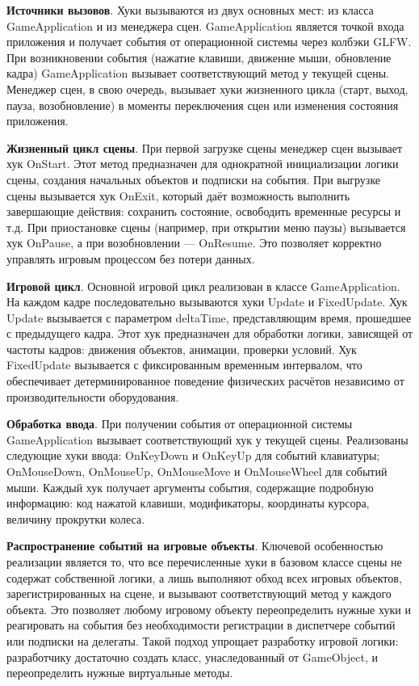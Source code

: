 \textbf{Источники вызовов}. Хуки вызываются из двух основных мест: из класса GameApplication и из менеджера сцен. GameApplication является точкой входа приложения и получает события от операционной системы через колбэки GLFW. При возникновении события (нажатие клавиши, движение мыши, обновление кадра) GameApplication вызывает соответствующий метод у текущей сцены. Менеджер сцен, в свою очередь, вызывает хуки жизненного цикла (старт, выход, пауза, возобновление) в моменты переключения сцен или изменения состояния приложения.

\textbf{Жизненный цикл сцены}. При первой загрузке сцены менеджер сцен вызывает хук OnStart. Этот метод предназначен для однократной инициализации логики сцены, создания начальных объектов и подписки на события. При выгрузке сцены вызывается хук OnExit, который даёт возможность выполнить завершающие действия: сохранить состояние, освободить временные ресурсы и т.д. При приостановке сцены (например, при открытии меню паузы) вызывается хук OnPause, а при возобновлении — OnResume. Это позволяет корректно управлять игровым процессом без потери данных.

\textbf{Игровой цикл}. Основной игровой цикл реализован в классе GameApplication. На каждом кадре последовательно вызываются хуки Update и FixedUpdate. Хук Update вызывается с параметром deltaTime, представляющим время, прошедшее с предыдущего кадра. Этот хук предназначен для обработки логики, зависящей от частоты кадров: движения объектов, анимации, проверки условий. Хук FixedUpdate вызывается с фиксированным временным интервалом, что обеспечивает детерминированное поведение физических расчётов независимо от производительности оборудования.

\textbf{Обработка ввода}. При получении события от операционной системы GameApplication вызывает соответствующий хук у текущей сцены. Реализованы следующие хуки ввода: OnKeyDown и OnKeyUp для событий клавиатуры; OnMouseDown, OnMouseUp, OnMouseMove и OnMouseWheel для событий мыши. Каждый хук получает аргументы события, содержащие подробную информацию: код нажатой клавиши, модификаторы, координаты курсора, величину прокрутки колеса.

\textbf{Распространение событий на игровые объекты}. Ключевой особенностью реализации является то, что все перечисленные хуки в базовом классе сцены не содержат собственной логики, а лишь выполняют обход всех игровых объектов, зарегистрированных на сцене, и вызывают соответствующий метод у каждого объекта. Это позволяет любому игровому объекту переопределить нужные хуки и реагировать на события без необходимости регистрации в диспетчере событий или подписки на делегаты. Такой подход упрощает разработку игровой логики: разработчику достаточно создать класс, унаследованный от GameObject, и переопределить нужные виртуальные методы.

